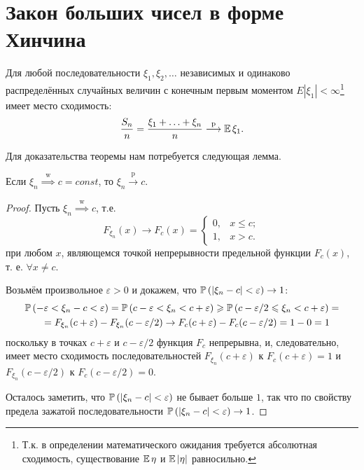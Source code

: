 \section{Закон больших чисел в форме Хинчина}
\begin{namedthm} \leavevmode

    Для любой последовательности $\xi_{1}, \xi_{2}, \ldots$ независимых и одинаково распределённых 
    случайных величин с конечным первым моментом $E\left|\xi_{1}\right|<\infty$\footnote{Т.к. в определении математического ожидания требуется абсолютная сходимость, существование $\operatorname{\mathbb{E}} \eta$ и $\operatorname{\mathbb{E}} \left| \eta \right|$ равносильно.} имеет место сходимость:
    \begin{equation*}
        \frac{S_{n}}{n} = \frac{\xi_{1}+\ldots+\xi_{n}}{n} %
        \stackrel{\text{p}}{\longrightarrow} \Exp \xi_1.
    \end{equation*}
\end{namedthm}
Для доказательства теоремы нам потребуется следующая лемма.
\begin{lem}
    Если $\xi_{n} \overset{\text{w}}{\implies} c=const$, то $\xi_{n} \xrightarrow[]{\text{p}} c$.
\end{lem}
\begin{proof}
    Пусть $\xi_{n} \overset{\text{w}}{\implies} c$, т.е.
    \begin{equation*}
        F_{\xi_{n}}(x) \to F_{c}(x) =
        \begin{cases}
            0, & x \leqslant c; \\
            1, & x > c.
        \end{cases}
    \end{equation*}
    при любом $x$, являющемся точкой непрерывности предельной функции $F_{c}(x)$, т. е. $\forall x \neq c$.
    
    Возьмём произвольное $\varepsilon>0$ и докажем, что $\operatorname{\mathbb{P}}\left(\left|\xi_{n}-c\right|<\varepsilon\right) \to 1$:
    \begin{multline*}
        \operatorname{\mathbb{P}}\left(-\varepsilon<\xi_{n}-c<\varepsilon\right)=\operatorname{\mathbb{P}}\left(c-\varepsilon<\xi_{n}<c+\varepsilon\right) \geqslant \operatorname{\mathbb{P}}\left(c-\varepsilon / 2 \leqslant \xi_{n}<c+\varepsilon\right)= \\
        \quad=F_{\xi_{n}}(c+\varepsilon)-F_{\xi_{n}}(c-\varepsilon / 2) \to F_{c}(c+\varepsilon)-F_{c}(c-\varepsilon / 2)=1-0=1
    \end{multline*}
    поскольку в точках $c+\varepsilon$ и $c-\varepsilon / 2$ функция $F_{c}$ непрерывна, и, следовательно, 
    имеет место сходимость последовательностей $F_{\xi_{n}}(c+\varepsilon)$ к $F_{c}(c+\varepsilon)=1$ и $F_{\xi_{n}}(c-\varepsilon / 2)$ к $F_{c}(c-\varepsilon / 2)=0$.
    
    Осталось заметить, что $\operatorname{\mathbb{P}}\left(\left|\xi_{n}-c\right|<\varepsilon\right)$ не бывает больше $1$, так что по свойству предела зажатой последовательности $\operatorname{\mathbb{P}}\left(\left|\xi_{n}-c\right|<\varepsilon\right) \to 1$.
\end{proof}

